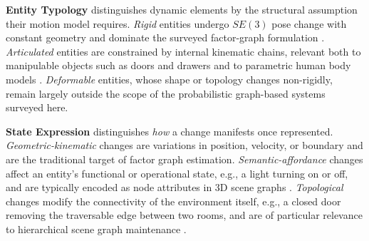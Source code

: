 \textbf{Entity Typology} distinguishes dynamic elements by the structural assumption their motion model requires. 
\textit{Rigid} entities undergo $SE(3)$ pose change with constant geometry and dominate the surveyed factor-graph formulation \cite{bescos_dynaslam_2021} \cite{qiu2022airdos}.
\textit{Articulated} entities are constrained by internal kinematic chains, relevant both to manipulable objects such as doors and drawers \cite{zhang_open-vocabulary_2025} and to parametric human body models \cite{henning_bodyslam_2022} \cite{henning_bodyslam_2023}.
\textit{Deformable} entities, whose shape or topology changes non-rigidly, remain largely outside the scope of the probabilistic graph-based systems surveyed here.

\textbf{State Expression} distinguishes \textit{how} a change manifests once represented. 
\textit{Geometric-kinematic} changes are variations in position, velocity, or boundary and are the traditional target of factor graph estimation.
\textit{Semantic-affordance} changes affect an entity's functional or operational state, e.g., a light turning on or off, and are typically encoded as node attributes in 3D scene graphs \cite{catalano_3d_2025} \cite{olivastri_multi-modal_2024}.
\textit{Topological} changes modify the connectivity of the environment itself, e.g., a closed door removing the traversable edge between two rooms, and are of particular relevance to hierarchical scene graph maintenance \cite{catalano_3d_2025}.

